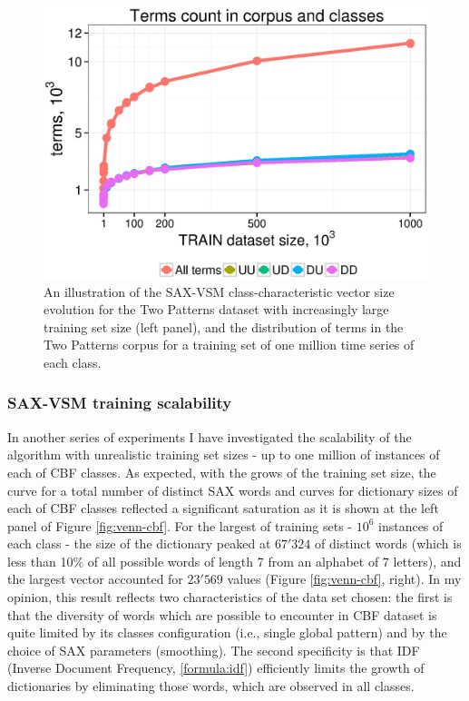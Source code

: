 \begin{figure}[t]
   \includegraphics[width=140mm]{figures/words-two-patterns.ps}
   \caption[An illustration of the SAX-VSM class-characteristic vector size evolution for the Two Patterns dataset 
   with increasingly large training set size.]{An illustration of the SAX-VSM class-characteristic vector size evolution for the Two Patterns dataset 
   with increasingly large training set size (left panel), and the distribution of terms in the Two Patterns corpus for 
   a training set of one million time series of each class.}
   \label{fig:venn-2p}
\end{figure}

\subsubsection{SAX-VSM training scalability }
In another series of experiments I have investigated the scalability of the algorithm with
unrealistic training set sizes - up to one million of instances of each of CBF classes.
As expected, with the grows of the training set size, the curve for a total number of distinct SAX
words and curves for dictionary sizes of each of CBF classes reflected a significant saturation 
as it is shown at the left panel of Figure \ref{fig:venn-cbf}. 
For the largest of training sets - $10^6$ instances of each class - the size of the dictionary peaked at $67'324$ 
of distinct words (which is less than 10\% of all possible words of length 7 from an alphabet of 7 letters), 
and the largest \tfidf vector accounted for $23'569$ values (Figure \ref{fig:venn-cbf}, right). 
In my opinion, this result reflects two characteristics of the data set chosen: the first is that the diversity of words which 
are possible to encounter in CBF dataset is quite limited by its classes configuration (i.e., single global 
pattern) and by the choice of SAX parameters (smoothing). 
The second specificity is that IDF (Inverse Document Frequency, \ref{formula:idf})
efficiently limits the growth of dictionaries by eliminating those words, which are observed in all
classes. 

